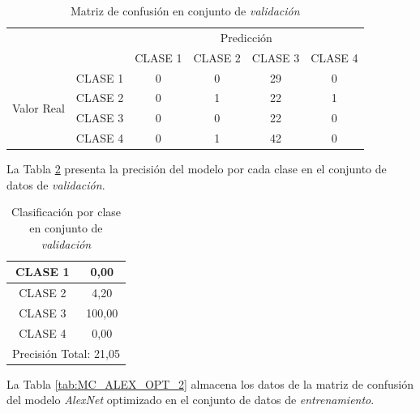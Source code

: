 \begin{table}[htbp]
	\centering
	\resizebox{10cm}{!} {
	\begin{tabular}{|c|l|c|c|c|c|}
		\hline
		\multicolumn{2}{|c|}{\multirow{2}[4]{*}{}} & \multicolumn{4}{c|}{Predicción} \bigstrut\\
		\cline{3-6}    \multicolumn{2}{|c|}{} & CLASE 1 & CLASE 2 & CLASE 3 & CLASE 4 \bigstrut\\
		\hline
		\multirow{4}[8]{*}{\begin{sideways}Valor Real\end{sideways}} & CLASE 1 & 0     & 0     & 29    & 0 \bigstrut\\
		\cline{2-6}          & CLASE 2 & 0     & 1     & 22    & 1 \bigstrut\\
		\cline{2-6}          & CLASE 3 & 0     & 0     & 22    & 0 \bigstrut\\
		\cline{2-6}          & CLASE 4 & 0     & 1     & 42    & 0 \bigstrut\\
		\hline
	\end{tabular}
	}
	\caption{Matriz de confusión en conjunto de \textit{validación}}
	\label{tab:MC_ALEX_OPT}%
\end{table}%

La Tabla \ref{tab:Alexoptclases} presenta la precisión del modelo por cada clase en el conjunto de datos de \textit{validación}.


\begin{table}[htbp]
	\centering
	\begin{tabular}{|c|c|}
		\hline
		CLASE 1 & 0,00 \bigstrut\\
		\hline
		CLASE 2 & 4,20 \bigstrut\\
		\hline
		CLASE 3 & 100,00 \bigstrut\\
		\hline
		CLASE 4 & 0,00 \bigstrut\\
		\hline
		\multicolumn{2}{|c|}{Precisión Total: 21,05} \bigstrut\\
		\hline
	\end{tabular}%
	\caption{Clasificación por clase en conjunto de \textit{validación}
	}
	\label{tab:Alexoptclases}%
\end{table}%

La Tabla \ref{tab:MC_ALEX_OPT_2} almacena los datos de la matriz de confusión del modelo \textit{AlexNet} optimizado en el conjunto de datos de \textit{entrenamiento}.

